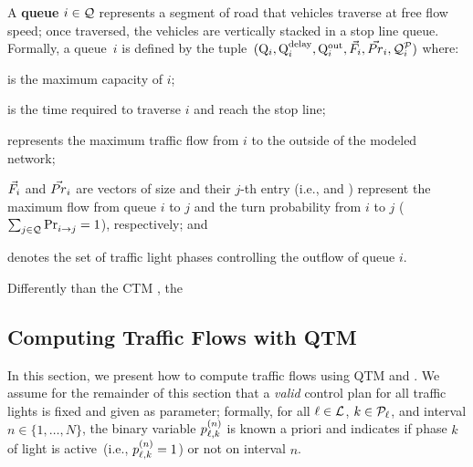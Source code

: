A \textbf{queue} $i \in \mathcal{Q}$ represents a segment of road that vehicles
traverse at free flow speed; once traversed, the vehicles are vertically stacked
in a stop line queue.
%
Formally, a queue~$i$ is defined by the tuple~$(\mathrm{Q}_{i}, \mathrm{Q}_{i}^{\mathrm{delay}}, \mathrm{Q}_{i}^{\mathrm{out}},
\vec{F}_i, \vec{Pr}_i, \mathcal{Q}_{i}^{\mathcal{P}})$ where:
%
\begin{itemize*}[label={}]
%
\item {} is the maximum capacity of $i$;
%
\item {} is the time required to traverse $i$ and reach the stop line;
%
\item {} represents the maximum traffic flow from $i$ to the outside of
  the modeled network;
%
\item $\vec{F}_i$ and $\vec{Pr}_i$ are vectors of size \Qn and their $j$-th entry
  (i.e.,  and ) represent the maximum flow from queue $i$
  to $j$ and the turn probability from $i$ to $j$ ($\sum_{j \in
  \mathcal{Q}}\mathrm{Pr}_{i\to j}^{\mathrm{}} = 1$), respectively; and
%
\item {} denotes the set of traffic light phases controlling the outflow
  of queue $i$.
%
\end{itemize*}


Differently than the CTM \cite{daganzo1994cell,lin2004enhanced}, the
%



\subsection{Computing Traffic Flows with QTM}

In this section, we present how to compute traffic flows using QTM and
.
%
We assume for the remainder of this section that a \emph{valid} control plan for
all traffic lights is fixed and given as parameter;
%
formally, for all $\ell \in \mathcal{L}$, $k \in \mathcal{P}_\ell$, and interval $n \in
\{1,\dots,N\}$, the binary variable $p_{\ell,k}^{(n)}$ is known a priori and indicates
if phase $k$ of light \tl is active~(i.e., $p_{\ell,k}^{(n)} = 1$) or not on interval
$n$.


